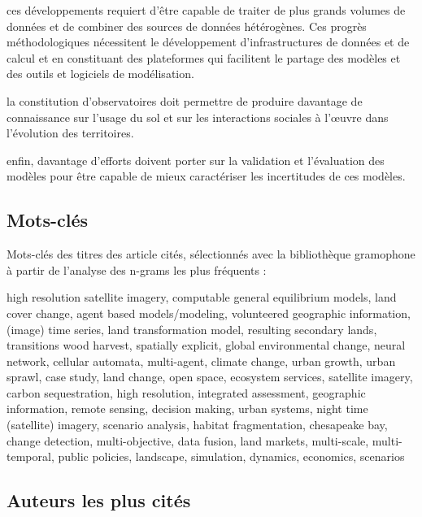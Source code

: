 \item ces développements requiert d’être capable de traiter de plus grands
volumes de données et de combiner des sources de données hétérogènes. Ces
progrès méthodologiques nécessitent le développement d’infrastructures de
données et de calcul et en constituant des plateformes qui facilitent le
partage des modèles et des outils et logiciels de modélisation.

\item la constitution d’observatoires doit permettre de produire davantage de
connaissance sur l’usage du sol et sur les interactions sociales à l’œuvre
dans l’évolution des territoires.

\item enfin, davantage d’efforts doivent porter
sur la validation et l’évaluation des modèles pour être capable de mieux
caractériser les incertitudes de ces modèles.

\subsection{Mots-clés}

Mots-clés des titres des article cités, sélectionnés avec la bibliothèque gramophone à partir de l’analyse des n-grams les plus fréquents :

high resolution satellite imagery, computable general equilibrium models, land
cover change, agent based models/modeling, volunteered geographic information,
(image) time series, land transformation model, resulting secondary lands,
transitions wood harvest, spatially explicit, global environmental change,
neural network, cellular automata, multi-agent, climate change, urban growth,
urban sprawl, case study, land change, open space, ecosystem services,
satellite imagery, carbon sequestration, high resolution, integrated
assessment, geographic information, remote sensing, decision making, urban
systems, night time (satellite) imagery, scenario analysis, habitat
fragmentation, chesapeake bay, change detection, multi-objective, data fusion,
land markets, multi-scale, multi-temporal, public policies, landscape,
simulation, dynamics, economics, scenarios

\subsection
{Auteurs les plus cités}

\startcolumns[n=3]
\startitemize[n]

